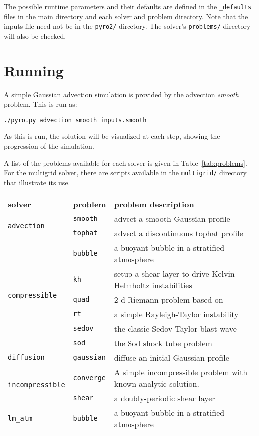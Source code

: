 The possible runtime parameters and their defaults are defined in the
{\tt \_defaults} files in the main directory and each solver and
problem directory.  Note that the inputs file need not be in the 
{\tt pyro2/} directory.  The solver's {\tt problems/} directory
will also be checked.

\section{Running \pyro}

A simple Gaussian advection simulation is provided by the advection
{\em smooth} problem.  This is run as:
\begin{verbatim}
./pyro.py advection smooth inputs.smooth
\end{verbatim}
As this is run, the solution will be visualized at each step,
showing the progression of the simulation.  


A list of the problems available for each solver is given in
Table~\ref{tab:problems}.  For the multigrid solver, there are scripts
available in the {\tt multigrid/} directory that illustrate its use.



\begin{table*}[t]
\centering
\renewcommand{\arraystretch}{1.2}
\begin{tabular}{llp{2.5in}}
\hline
{\bf solver} & {\bf problem} 
   & {\bf problem description} \\
\hline
%
\multirow{2}{*}{\tt advection}
   & {\tt smooth} & advect a smooth Gaussian profile \\
   & {\tt tophat} & advect a discontinuous tophat profile \\
\hline
%
\multirow{6}{*}{\tt compressible}
   & {\tt bubble} & a buoyant bubble in a stratified atmosphere \\
   & {\tt kh} & setup a shear layer to drive Kelvin-Helmholtz instabilities \\
   & {\tt quad} & 2-d Riemann problem based on \cite{schulz-rinne:1993}  \\
   & {\tt rt}  & a simple Rayleigh-Taylor instability\\
   & {\tt sedov} & the classic Sedov-Taylor blast wave \\
   & {\tt sod} & the Sod shock tube problem  \\
\hline
%
{\tt diffusion}& {\tt gaussian}
   & diffuse an initial Gaussian profile \\
\hline
%
\multirow{2}{*}{\tt incompressible}
   & {\tt converge} & A simple incompressible problem with known
                      analytic solution.\\
   & {\tt shear} & a doubly-periodic shear layer \\
\hline
%
\multirow{2}{*}{\tt lm\_atm}
   & {\tt bubble} & a buoyant bubble in a stratified atmosphere \\
\hline
\end{tabular}
\caption{\label{tab:problems} Solvers and their distributed problems}
\renewcommand{\arraystretch}{1.0}
\end{table*}




